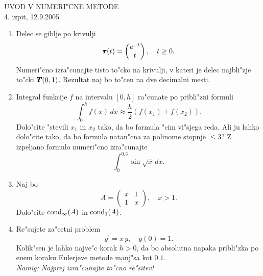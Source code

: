 \documentclass[12pt,a4paper]{article}
\def\bfm#1{{\dimen0=.01em\dimen1=.009em\makebold{$#1$}}}
\def\makebold#1{\mathord{\setbox0=\hbox{#1}
       \copy0\kern-\wd0
       \raise\dimen1\copy0\kern-\wd0
       {\advance\dimen1 by \dimen1\raise\dimen1\copy0}\kern-\wd0
       \kern\dimen0\raise\dimen1\copy0\kern-\wd0
       {\advance\dimen1 by \dimen1\raise\dimen1\copy0}\kern-\wd0
       \kern\dimen0\raise\dimen1\copy0\kern-\wd0
       {\advance\dimen1 by \dimen1\raise\dimen1\copy0}\kern-\wd0
       \kern\dimen0\raise\dimen1\copy0\kern-\wd0
       \kern\dimen0\box0}}
\begin{document}
\begin{center}
  {\large UVOD V NUMERI"CNE METODE\\
    4. izpit, 12.9.2005\\
    }
\end{center}
\vspace{1cm}

\begin{enumerate}
  
  \item Delec se giblje po krivulji
    \begin{equation*}
    	\bfm{r}(t)=
    	\begin{pmatrix}
    	  e^{-t}\\
    	  t
    	\end{pmatrix}, \quad t\geq 0.
    \end{equation*}
    Numeri"cno izra"cunajte tisto to"cko na krivulji, v
    kateri je delec najbli"zje to"cki $\bfm{T}(0,1)$.
    Rezultat naj bo to"cen na dve decimalni mesti.
    
  \item Integral funkcije $f$ na intervalu $[0,h]$
    ra"cunate po pribli"zni formuli
    \begin{equation*}
      \int_0^h f(x)\,dx\approx \frac{h}{2}
      \left(f(x_1)+f(x_2)\right).
    \end{equation*}
    Dolo"cite "stevili $x_1$ in $x_2$ tako, da bo
    formula "cim vi"sjega reda. Ali ju lahko dolo"cite
    tako, da bo formula natan"cna za polinome stopnje
    $\leq 3$? Z izpeljano formulo numeri"cno
    izra"cunajte 
    \begin{equation*}
      \int_0^{0.3}\sin{\sqrt{x}}\,dx.
    \end{equation*}
  
  \item Naj bo 
    \begin{equation*}
      A=
      \begin{pmatrix}
        x & 1\\
        1 & x
      \end{pmatrix},\quad x>1.
    \end{equation*}
    Dolo"cite ${\rm cond}_\infty(A)$ in
    ${\rm cond}_1(A)$.
    
  \item Re"sujete za"cetni problem 
    \begin{equation*}
      y^{'}=x\,y,\quad y(0)=1.
    \end{equation*}
    Kolik"sen je lahko najve"c korak $h>0$, da bo 
    absolutna napaka pribli"zka po enem koraku Eulerjeve metode
    manj"sa kot $0.1$.\\
    {\sl Namig: Najprej izra"cunajte to"cno re"sitev!}
\end{enumerate}
\end{document}
